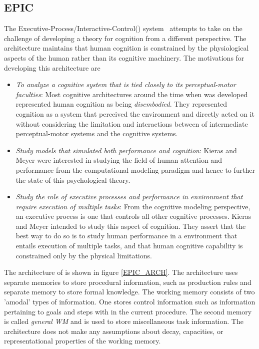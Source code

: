 

\subsection{EPIC}
The Executive-Process/Interactive-Control(\epic)
system~\cite{kieras1997overview} attempts to take on the challenge of
developing a theory for cognition from a different perspective. The
\epic architecture maintains that human cognition is constrained by the
physiological aspects of the human rather than its cognitive
machinery. The motivations for developing this architecture are

\begin{itemize}
\item \emph{To analyze a cognitive system that is tied closely to its
    perceptual-motor faculties}: Most cognitive architectures around
  the time when \epic was developed represented human cognition as
  being \emph{disembodied}. They represented cognition as a system that
  perceived the environment and directly acted on it without
  considering the limitation and interactions between of intermediate
  perceptual-motor systems and the cognitive systems.
\item \emph{Study models that simulated both performance and
    cognition}: Kieras and Meyer were interested in studying the field of
  human attention and performance from the computational modeling
  paradigm and hence to further the state of this psychological theory.
\item \emph{Study the role of executive processes and performance in
    environment that require execution of multiple tasks}: From the
  cognitive modeling perspective, an executive process is one that
  controls all other cognitive processes. Kieras and Meyer intended to
  study this aspect of cognition. They assert that the best way to do
  so is to study human performance in a environment that entails
  execution of multiple tasks, and that human cognitive capability is
  constrained only by the physical limitations.
\end{itemize}

The architecture of \epic is shown in figure \ref{EPIC_ARCH}.
%
The \epic architecture uses separate memories to store procedural
information, such as production rules and separate memory to store
formal knowledge. The working memory consists of two 'amodal' types of
information.  One stores control information such as information
pertaining to goals and steps with in the current procedure. The
second memory is called {\em general WM} and is used to store
miscellaneous task information. The \epic architecture does not make
any assumptions about decay, capacities, or representational
properties of the working memory\cite{citeulike:3439185}.

